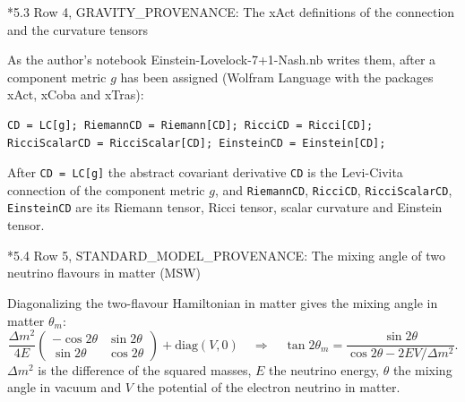 \documentclass[10pt,a4paper]{article}
\makeatletter
\renewcommand\subsection{\@startsection{subsection}{2}{\z@}{-3.25ex\@plus -1ex \@minus -.2ex}{1.5ex \@plus .2ex}{\normalfont\large\bfseries\raggedright}}
\makeatother
\begin{document}
\subsection*{5.3 Row 4, GRAVITY\_PROVENANCE: The xAct definitions of the connection and the curvature tensors}
As the author’s notebook Einstein-Lovelock-7+1-Nash.nb writes them, after a component metric $g$ has been assigned (Wolfram Language with the packages xAct, xCoba and xTras):

\begin{Verbatim}[fontsize=\small,frame=single,framesep=2mm]
CD = LC[g]; RiemannCD = Riemann[CD]; RicciCD = Ricci[CD];
RicciScalarCD = RicciScalar[CD]; EinsteinCD = Einstein[CD];
\end{Verbatim}
After \texttt{CD = LC[g]} the abstract covariant derivative \texttt{CD} is the Levi-Civita connection of the component metric $g$, and \texttt{RiemannCD}, \texttt{RicciCD}, \texttt{RicciScalarCD}, \texttt{EinsteinCD} are its Riemann tensor, Ricci tensor, scalar curvature and Einstein tensor.

\subsection*{5.4 Row 5, STANDARD\_MODEL\_PROVENANCE: The mixing angle of two neutrino flavours in matter (MSW)}
Diagonalizing the two-flavour Hamiltonian in matter gives the mixing angle in matter $\theta_m$:
\begin{equation*}
\frac{\Delta m^2}{4E}\begin{pmatrix}-\cos2\theta&\sin2\theta\\\sin2\theta&\cos2\theta\end{pmatrix}+\mathrm{diag}(V,0)\quad\Longrightarrow\quad \tan2\theta_m=\frac{\sin2\theta}{\cos2\theta-2EV/\Delta m^2} .
\end{equation*}
$\Delta m^2$ is the difference of the squared masses, $E$ the neutrino energy, $\theta$ the mixing angle in vacuum and $V$ the potential of the electron neutrino in matter.
\end{document}
